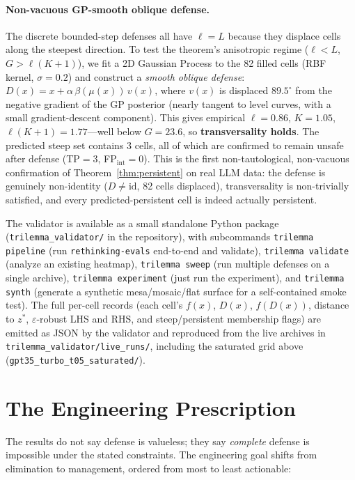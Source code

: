 \documentclass{article}
\begin{document}
\paragraph{Non-vacuous GP-smooth oblique defense.}
The discrete bounded-step defenses all have $\ell = L$ because
they displace cells along the steepest direction. To test the
theorem's anisotropic regime ($\ell < L$, $G > \ell(K{+}1)$), we
fit a 2D Gaussian Process to the 82 filled cells (RBF kernel,
$\sigma = 0.2$) and construct a \emph{smooth oblique defense}:
$D(x) = x + \alpha\,\beta(\mu(x))\,v(x)$, where $v(x)$ is
displaced $89.5^\circ$ from the negative gradient of the GP
posterior (nearly tangent to level curves, with a small gradient-descent
component). This gives empirical $\ell = 0.86$, $K = 1.05$,
$\ell(K{+}1) = 1.77$---well below $G = 23.6$, so
\textbf{transversality holds}. The predicted steep set contains
$3$ cells, all of which are confirmed to remain unsafe after
defense (TP${} = 3$, FP${}_{\text{int}} = 0$). This is the
first non-tautological, non-vacuous confirmation of
Theorem~\ref{thm:persistent} on real LLM data: the defense is
genuinely non-identity ($D \neq \mathrm{id}$, 82 cells displaced),
transversality is non-trivially satisfied, and every
predicted-persistent cell is indeed actually persistent.

The validator is available as a small standalone Python package
(\texttt{trilemma\_validator/} in the repository), with subcommands
\texttt{trilemma pipeline} (run \texttt{rethinking-evals} end-to-end
and validate), \texttt{trilemma validate} (analyze an existing
heatmap), \texttt{trilemma sweep} (run multiple defenses on a single
archive), \texttt{trilemma experiment} (just run the experiment),
and \texttt{trilemma synth} (generate a synthetic
mesa/mosaic/flat surface for a self-contained smoke test). The full
per-cell records (each cell's $f(x)$, $D(x)$, $f(D(x))$, distance
to $z^{*}$, $\varepsilon$-robust LHS and RHS, and steep/persistent
membership flags) are emitted as JSON by the validator and
reproduced from the live archives in
\texttt{trilemma\_validator/live\_runs/}, including the saturated
grid above (\texttt{gpt35\_turbo\_t05\_saturated/}).


\section{The Engineering Prescription}
\label{sec:engineering}

The results do not say defense is valueless; they say \emph{complete}
defense is impossible under the stated constraints. The engineering
goal shifts from elimination to management, ordered from most to least
actionable:
\end{document}
